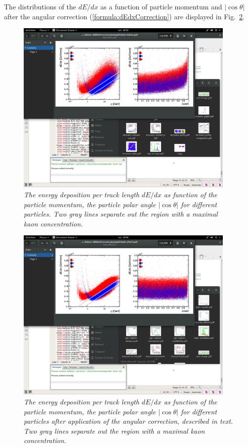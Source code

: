 The distributions of the $dE/dx$ as a function of particle momentum and $|\cos\theta|$ after the angular correction (\ref{formula:dEdxCorrection}) are displayed in Fig.~\ref{fig:dEdxAfter_3}.
\begin{figure}
{\centering
    \includegraphics[clip, trim=8cm 18.5cm 7cm 4cm,width=0.95\textwidth]{ILD/plots/dedx-before.png}
    \caption{\sl The energy deposition per track length $dE/dx$ as function of the particle momentum, the particle polar angle $|\cos\theta|$ for different particles. Two gray lines separate out the region with a maximal kaon concentration. 
    }
    \label{fig:dEdxBefore_3}
  }
\end{figure}

\begin{figure}
{\centering
    \includegraphics[clip, trim=8cm 18.5cm 7cm 4cm, width=0.95\textwidth]{ILD/plots/dedx-after.png}
    \caption{\sl The energy deposition per track length $dE/dx$ as function of the particle momentum, the particle polar angle $|\cos\theta|$ for different particles after application of the angular correction, described in text. Two gray lines separate out the region with a maximal kaon concentration. 
    }
    \label{fig:dEdxAfter_3}
  }
\end{figure}

